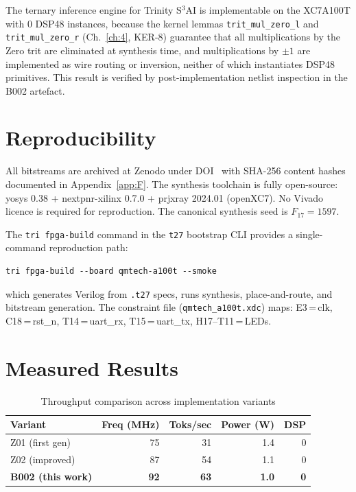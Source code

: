 \begin{theorem}
\label{thm:zero-dsp}
The ternary inference engine for Trinity S$^3$AI is implementable on the XC7A100T with 0 DSP48 instances, because the kernel lemmas \texttt{trit\_mul\_zero\_l} and \texttt{trit\_mul\_zero\_r} (Ch.~\ref{ch:4}, KER-8) guarantee that all multiplications by the Zero trit are eliminated at synthesis time, and multiplications by $\pm 1$ are implemented as wire routing or inversion, neither of which instantiates DSP48 primitives. This result is verified by post-implementation netlist inspection in the B002 artefact.
\end{theorem}

\section{Reproducibility}

All bitstreams are archived at Zenodo under DOI~\cite{zenodo_B002} with SHA-256 content hashes documented in Appendix~\ref{app:F}. The synthesis toolchain is fully open-source: yosys 0.38 + nextpnr-xilinx 0.7.0 + prjxray 2024.01 (openXC7). No Vivado licence is required for reproduction. The canonical synthesis seed is $F_{17} = 1597$.

The \texttt{tri fpga-build} command in the \texttt{t27} bootstrap CLI provides a single-command reproduction path:
\begin{verbatim}
tri fpga-build --board qmtech-a100t --smoke
\end{verbatim}
which generates Verilog from \texttt{.t27} specs, runs synthesis, place-and-route, and bitstream generation. The constraint file (\texttt{qmtech\_a100t.xdc}) maps: E3\,=\,clk, C18\,=\,rst\_n, T14\,=\,uart\_rx, T15\,=\,uart\_tx, H17--T11\,=\,LEDs.

\section{Measured Results}

\begin{table}[h]
\centering
\caption{Throughput comparison across implementation variants}
\label{tab:throughput-comparison}
\begin{tabular}{lrrrr}
\toprule
\textbf{Variant} & \textbf{Freq (MHz)} & \textbf{Toks/sec} & \textbf{Power (W)} & \textbf{DSP} \\
\midrule
Z01 (first gen)         & 75  & 31  & 1.4 & 0 \\
Z02 (improved)          & 87  & 54  & 1.1 & 0 \\
\textbf{B002 (this work)} & \textbf{92} & \textbf{63} & \textbf{1.0} & \textbf{0} \\
\bottomrule
\end{tabular}
\end{table}

